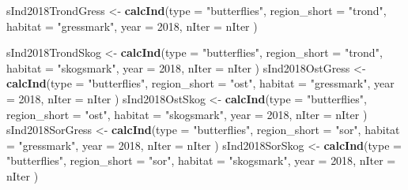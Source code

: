\documentclass[]{article}
\newenvironment{Shaded}{\begin{snugshade}}{\end{snugshade}}
\newcommand{\KeywordTok}[1]{\textcolor[rgb]{0.13,0.29,0.53}{\textbf{#1}}}
\newcommand{\DataTypeTok}[1]{\textcolor[rgb]{0.13,0.29,0.53}{#1}}
\newcommand{\DecValTok}[1]{\textcolor[rgb]{0.00,0.00,0.81}{#1}}
\newcommand{\StringTok}[1]{\textcolor[rgb]{0.31,0.60,0.02}{#1}}
\newcommand{\NormalTok}[1]{#1}
\begin{document}
\begin{Shaded}
\begin{Highlighting}[]
\NormalTok{sInd2018TrondGress <-}\StringTok{ }\KeywordTok{calcInd}\NormalTok{(}\DataTypeTok{type =} \StringTok{"butterflies"}\NormalTok{,}
                              \DataTypeTok{region_short =} \StringTok{"trond"}\NormalTok{,}
                              \DataTypeTok{habitat =} \StringTok{"gressmark"}\NormalTok{,}
                              \DataTypeTok{year =} \DecValTok{2018}\NormalTok{,}
                              \DataTypeTok{nIter =}\NormalTok{ nIter}
\NormalTok{                              )}
       
\NormalTok{sInd2018TrondSkog <-}\StringTok{ }\KeywordTok{calcInd}\NormalTok{(}\DataTypeTok{type =} \StringTok{"butterflies"}\NormalTok{,}
                              \DataTypeTok{region_short =} \StringTok{"trond"}\NormalTok{,}
                              \DataTypeTok{habitat =} \StringTok{"skogsmark"}\NormalTok{,}
                              \DataTypeTok{year =} \DecValTok{2018}\NormalTok{,}
                              \DataTypeTok{nIter =}\NormalTok{ nIter}
\NormalTok{                              )}
\NormalTok{sInd2018OstGress <-}\StringTok{ }\KeywordTok{calcInd}\NormalTok{(}\DataTypeTok{type =} \StringTok{"butterflies"}\NormalTok{,}
                              \DataTypeTok{region_short =} \StringTok{"ost"}\NormalTok{,}
                              \DataTypeTok{habitat =} \StringTok{"gressmark"}\NormalTok{,}
                              \DataTypeTok{year =} \DecValTok{2018}\NormalTok{,}
                              \DataTypeTok{nIter =}\NormalTok{ nIter}
\NormalTok{                              )}
\NormalTok{sInd2018OstSkog <-}\StringTok{ }\KeywordTok{calcInd}\NormalTok{(}\DataTypeTok{type =} \StringTok{"butterflies"}\NormalTok{,}
                              \DataTypeTok{region_short =} \StringTok{"ost"}\NormalTok{,}
                              \DataTypeTok{habitat =} \StringTok{"skogsmark"}\NormalTok{,}
                              \DataTypeTok{year =} \DecValTok{2018}\NormalTok{,}
                              \DataTypeTok{nIter =}\NormalTok{ nIter}
\NormalTok{                              )}
\NormalTok{sInd2018SorGress <-}\StringTok{ }\KeywordTok{calcInd}\NormalTok{(}\DataTypeTok{type =} \StringTok{"butterflies"}\NormalTok{,}
                              \DataTypeTok{region_short =} \StringTok{"sor"}\NormalTok{,}
                              \DataTypeTok{habitat =} \StringTok{"gressmark"}\NormalTok{,}
                              \DataTypeTok{year =} \DecValTok{2018}\NormalTok{,}
                              \DataTypeTok{nIter =}\NormalTok{ nIter}
\NormalTok{                              )}
\NormalTok{sInd2018SorSkog <-}\StringTok{ }\KeywordTok{calcInd}\NormalTok{(}\DataTypeTok{type =} \StringTok{"butterflies"}\NormalTok{,}
                              \DataTypeTok{region_short =} \StringTok{"sor"}\NormalTok{,}
                              \DataTypeTok{habitat =} \StringTok{"skogsmark"}\NormalTok{,}
                              \DataTypeTok{year =} \DecValTok{2018}\NormalTok{,}
                              \DataTypeTok{nIter =}\NormalTok{ nIter}
\NormalTok{                              )}


\end{Highlighting}
\end{Shaded}
\end{document}
